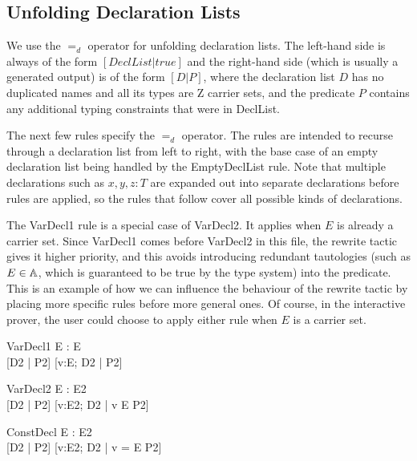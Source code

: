 \documentclass{entcs}
\newcommand{\declListUnfoldsTo}{\mathrel{=_d}}
\begin{document}
\subsection{Unfolding Declaration Lists}

We use the $\declListUnfoldsTo$ operator for unfolding declaration
lists.   The left-hand side is always of the form $[DeclList|true]$
and the right-hand side (which is usually a generated output) is
of the form $[D|P]$, where the declaration list $D$ has no duplicated
names and all its types are Z carrier sets, and the predicate $P$
contains any additional typing constraints that were in DeclList.

The next few rules specify the $\declListUnfoldsTo$ operator.
The rules are intended to recurse through a declaration list from left
to right, with the base case of an empty declaration list being handled
by the EmptyDeclList rule.  Note that multiple declarations such as
$x,y,z:T$ are expanded out into separate declarations before rules
are applied, so the rules that follow cover all possible kinds
of declarations.

The VarDecl1 rule is a special case of VarDecl2.  It applies when $E$ is
already a carrier set.  Since VarDecl1 comes before VarDecl2 in this file,
the rewrite tactic gives it higher priority, and this avoids introducing
redundant tautologies (such as $E \in {\mathbb A}$, which is guaranteed to
be true by the type system) into the predicate.  This is an example of
how we can influence the behaviour of the rewrite tactic by placing more
specific rules before more general ones.  Of course, in the interactive
prover, the user could choose to apply either rule when $E$ is a
carrier set.

\begin{zedrule}{VarDecl1}
   \proviso E : \power E \\
   [D1 | true] \declListUnfoldsTo [D2 | P2]
\derives
   [v:E; D1 | true] \declListUnfoldsTo [v:E; D2 |  P2]
\end{zedrule}

\begin{zedrule}{VarDecl2}
   \proviso E : \power E2 \\
   [D1 | true] \declListUnfoldsTo [D2 | P2]
\derives
   [v:E; D1 | true] \declListUnfoldsTo [v:E2; D2 |  v \in E \land P2]
\end{zedrule}

\begin{zedrule}{ConstDecl}
   \proviso E : E2 \\
   [D1 | true] \declListUnfoldsTo [D2 | P2]
\derives
   [v==E; D1 | true] \declListUnfoldsTo [v:E2; D2 |  v = E \land P2]
\end{zedrule}
\end{document}
